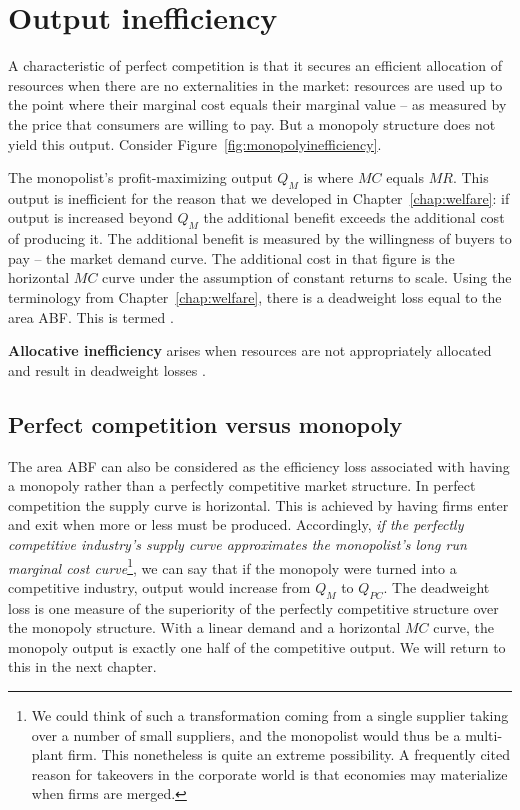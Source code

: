 \section{Output inefficiency}\label{sec:ch10sec4}

A characteristic of perfect competition is that it secures an efficient allocation of resources when there are no externalities in the market: resources are used up to the point where their marginal cost equals their marginal value -- as measured by the price that consumers are willing to pay. But a monopoly structure does not yield this output. Consider Figure~\ref{fig:monopolyinefficiency}. 



The monopolist's profit-maximizing output $Q_M$ is where $MC$ equals $MR$. This output is inefficient for the reason that we developed in Chapter~\ref{chap:welfare}: if output is increased beyond $Q_M$ the additional benefit exceeds the additional cost of producing it. The additional benefit is measured by the willingness of buyers to pay -- the market demand curve. The additional cost in that figure is the horizontal $MC$ curve under the assumption of constant returns to scale. Using the terminology from Chapter~\ref{chap:welfare}, there is a deadweight loss equal to the area ABF. This is termed .

\begin{DefBox}
\textbf{Allocative inefficiency} arises when resources are not appropriately allocated and result in deadweight losses .
\end{DefBox}

\subsection*{Perfect competition versus monopoly}

The area ABF can also be considered as the efficiency loss associated with having a monopoly rather than a perfectly competitive market structure. In perfect competition the supply curve is horizontal. This is achieved by having firms enter and exit when more or less must be produced. Accordingly, \textit{if the perfectly competitive industry's supply curve approximates the monopolist's long run marginal cost curve}\footnote{We could think of such a transformation coming from a single supplier taking over a number of small suppliers, and the monopolist would thus be a multi-plant firm. This nonetheless is quite an extreme possibility. A frequently cited reason for takeovers in the corporate world is that economies may materialize when firms are merged.}, we can say that if the monopoly were turned into a competitive industry, output would increase from $Q_M$ to $Q_{PC}$. The deadweight loss is one measure of the superiority of the perfectly competitive structure over the monopoly structure. With a linear demand and a horizontal $MC$ curve, the monopoly output is exactly one half of the competitive output. We will return to this in the next chapter.

